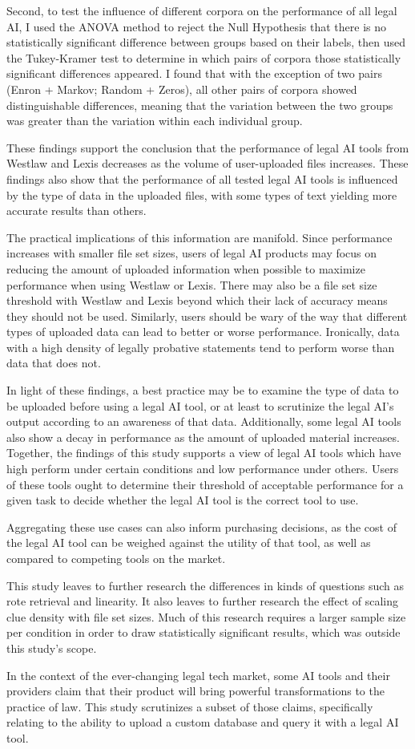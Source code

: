 \documentclass[
]{article}
\begin{document}
Second, to test the influence of different corpora on the performance of
all legal AI, I used the ANOVA method to reject the Null Hypothesis that
there is no statistically significant difference between groups based on
their labels, then used the Tukey-Kramer test to determine in which
pairs of corpora those statistically significant differences appeared. I
found that with the exception of two pairs (Enron + Markov; Random +
Zeros), all other pairs of corpora showed distinguishable differences,
meaning that the variation between the two groups was greater than the
variation within each individual group.

These findings support the conclusion that the performance of legal AI
tools from Westlaw and Lexis decreases as the volume of user-uploaded
files increases. These findings also show that the performance of all
tested legal AI tools is influenced by the type of data in the uploaded
files, with some types of text yielding more accurate results than
others.

The practical implications of this information are manifold. Since
performance increases with smaller file set sizes, users of legal AI
products may focus on reducing the amount of uploaded information when
possible to maximize performance when using Westlaw or Lexis. There may
also be a file set size threshold with Westlaw and Lexis beyond which
their lack of accuracy means they should not be used. Similarly, users
should be wary of the way that different types of uploaded data can lead
to better or worse performance. Ironically, data with a high density of
legally probative statements tend to perform worse than data that does
not.

In light of these findings, a best practice may be to examine the type
of data to be uploaded before using a legal AI tool, or at least to
scrutinize the legal AI's output according to an awareness of that data.
Additionally, some legal AI tools also show a decay in performance as
the amount of uploaded material increases. Together, the findings of
this study supports a view of legal AI tools which have high perform
under certain conditions and low performance under others. Users of
these tools ought to determine their threshold of acceptable performance
for a given task to decide whether the legal AI tool is the correct tool
to use.

Aggregating these use cases can also inform purchasing decisions, as the
cost of the legal AI tool can be weighed against the utility of that
tool, as well as compared to competing tools on the market.

This study leaves to further research the differences in kinds of
questions such as rote retrieval and linearity. It also leaves to
further research the effect of scaling clue density with file set sizes.
Much of this research requires a larger sample size per condition in
order to draw statistically significant results, which was outside this
study's scope.

In the context of the ever-changing legal tech market, some AI tools and
their providers claim that their product will bring powerful
transformations to the practice of law. This study scrutinizes a subset
of those claims, specifically relating to the ability to upload a custom
database and query it with a legal AI tool.
\end{document}
